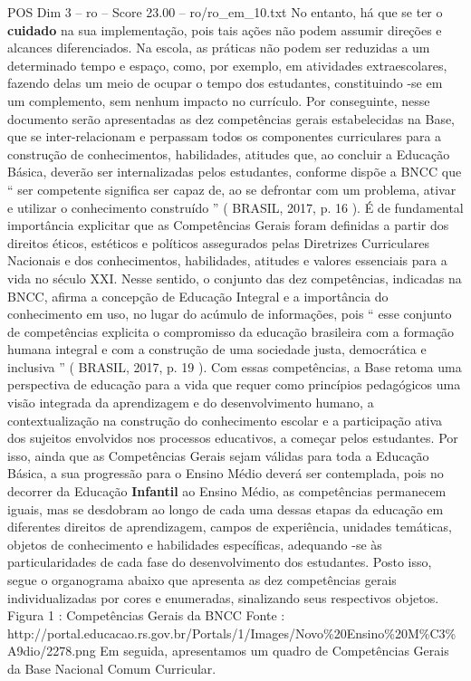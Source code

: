 \begin{textsample}{POS Dim 3 – ro – Score 23.00 – ro/ro\_em\_10.txt}
No entanto, há que se ter o \textbf{cuidado} na sua implementação, pois tais ações não podem assumir direções e alcances diferenciados.
Na escola, as práticas não podem ser reduzidas a um determinado tempo e espaço, como, por exemplo, em atividades extraescolares, fazendo delas um meio de ocupar o tempo dos estudantes, constituindo -se em um complemento, sem nenhum impacto no currículo.
Por conseguinte, nesse documento serão apresentadas as dez competências gerais estabelecidas na Base, que se inter-relacionam e perpassam todos os componentes curriculares para a construção de conhecimentos, habilidades, atitudes que, ao concluir a Educação Básica, deverão ser internalizadas pelos estudantes, conforme dispõe a BNCC que “ ser competente significa ser capaz de, ao se defrontar com um problema, ativar e utilizar o conhecimento construído ” ( BRASIL, 2017, p. 16 ).
É de fundamental importância explicitar que as Competências Gerais foram definidas a partir dos direitos éticos, estéticos e políticos assegurados pelas Diretrizes Curriculares Nacionais e dos conhecimentos, habilidades, atitudes e valores essenciais para a vida no século XXI.
Nesse sentido, o conjunto das dez competências, indicadas na BNCC, afirma a concepção de Educação Integral e a importância do conhecimento em uso, no lugar do acúmulo de informações, pois “ esse conjunto de competências explicita o compromisso da educação brasileira com a formação humana integral e com a construção de uma sociedade justa, democrática e inclusiva ” ( BRASIL, 2017, p. 19 ).
Com essas competências, a Base retoma uma perspectiva de educação para a vida que requer como princípios pedagógicos uma visão integrada da aprendizagem e do desenvolvimento humano, a contextualização na construção do conhecimento escolar e a participação ativa dos sujeitos envolvidos nos processos educativos, a começar pelos estudantes.
Por isso, ainda que as Competências Gerais sejam válidas para toda a Educação Básica, a sua progressão para o Ensino Médio deverá ser contemplada, pois no decorrer da Educação \textbf{Infantil} ao Ensino Médio, as competências permanecem iguais, mas se desdobram ao longo de cada uma dessas etapas da educação em diferentes direitos de aprendizagem, campos de experiência, unidades temáticas, objetos de conhecimento e habilidades específicas, adequando -se às particularidades de cada fase do desenvolvimento dos estudantes.
Posto isso, segue o organograma abaixo que apresenta as dez competências gerais individualizadas por cores e enumeradas, sinalizando seus respectivos objetos.
Figura 1 : Competências Gerais da BNCC Fonte : http://portal.educacao.rs.gov.br/Portals/1/Images/Novo\%20Ensino\%20M\%C3\%A9dio/2278.png Em seguida, apresentamos um quadro de Competências Gerais da Base Nacional Comum Curricular.

\end{textsample}
